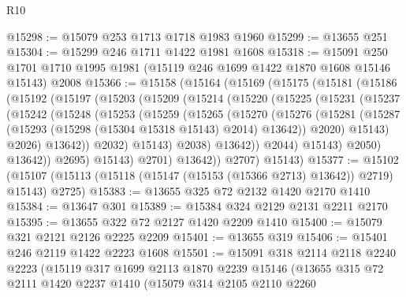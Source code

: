 \begin{lexlean}{R10}
\begin{coremodule}
@15298 := @15079 @253 @1713 @1718 @1983 @1960
@15299 := @13655 @251
@15304 := @15299 @246 @1711 @1422 @1981 @1608
@15318 := @15091
    @250
    @1701
    @1710
    @1995
    @1981
    (@15119 @246 @1699 @1422 @1870 @1608 @15146 @15143)
    @2008
@15366 := @15158
    (@15164
      (@15169
        (@15175
          (@15181
            (@15186
              (@15192
                (@15197
                  (@15203
                    (@15209
                      (@15214
                        (@15220
                          (@15225
                            (@15231
                              (@15237
                                (@15242
                                  (@15248
                                    (@15253
                                      (@15259
                                        (@15265
                                          (@15270
                                            (@15276
                                              (@15281
                                                (@15287
                                                  (@15293
                                                    (@15298 (@15304 @15318 @15143) @2014)
                                                    @13642))
                                                @2020)
                                              @15143)
                                            @2026)
                                          @13642))
                                      @2032)
                                    @15143)
                                  @2038)
                                @13642))
                            @2044)
                          @15143)
                        @2050)
                      @13642))
                  @2695)
                @15143)
              @2701)
            @13642))
        @2707)
      @15143)
@15377 := @15102
    (@15107 (@15113 (@15118 (@15147 (@15153 (@15366 @2713) @13642)) @2719) @15143) @2725)
@15383 := @13655 @325 @72 @2132 @1420 @2170 @1410
@15384 := @13647 @301
@15389 := @15384 @324 @2129 @2131 @2211 @2170
@15395 := @13655 @322 @72 @2127 @1420 @2209 @1410
@15400 := @15079 @321 @2121 @2126 @2225 @2209
@15401 := @13655 @319
@15406 := @15401 @246 @2119 @1422 @2223 @1608
@15501 := @15091
    @318
    @2114
    @2118
    @2240
    @2223
    (@15119
      @317
      @1699
      @2113
      @1870
      @2239
      @15146
      (@13655
        @315
        @72
        @2111
        @1420
        @2237
        @1410
        (@15079
          @314
          @2105
          @2110
          @2260

\end{coremodule}
\end{lexlean}
